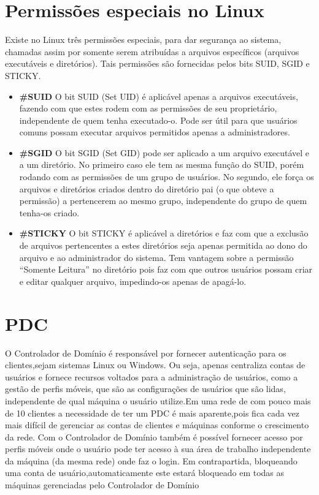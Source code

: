 
\section{Permissões especiais no Linux}

Existe no Linux três permissões especiais, para dar segurança ao sistema, chamadas assim por somente serem atribuídas a arquivos específicos (arquivos executáveis e diretórios). Tais permissões são fornecidas pelos bits SUID, SGID e STICKY.

  \begin{itemize}
    \item \textbf{\#SUID} O bit SUID (Set UID) é aplicável apenas a arquivos executáveis, fazendo com que estes rodem com as permissões de seu proprietário, independente de quem tenha executado-o. Pode ser útil para que usuários comuns possam executar arquivos permitidos apenas a administradores.

    \item \textbf{\#SGID} O bit SGID (Set GID) pode ser aplicado a um arquivo executável e a um diretório. No primeiro caso ele tem as mesma função do SUID, porém rodando com as permissões de um grupo de usuários. No segundo, ele força os arquivos e diretórios criados dentro do diretório pai (o que obteve a permissão) a pertencerem ao mesmo grupo, independente do grupo de quem tenha-os criado.

    \item \textbf{\#STICKY} O bit STICKY é aplicável a diretórios e faz com que a exclusão de arquivos pertencentes a estes diretórios seja apenas permitida ao dono do arquivo e ao administrador do sistema. Tem vantagem sobre a permissão “Somente Leitura” no diretório pois faz com que outros usuários possam criar e editar qualquer arquivo, impedindo-os apenas de apagá-lo.
  \end{itemize}

\section{PDC}

O Controlador de Domínio é responsável por fornecer autenticação para os clientes,sejam sistemas Linux ou Windows. Ou seja, apenas centraliza contas de usuários e fornece recursos voltados para a administração de usuários, como a gestão de perfis móveis, que são as configurações de usuários que são lidas, independente de qual máquina o usuário utilize.Em uma rede de com pouco mais de 10 clientes a necessidade de ter um PDC é mais aparente,pois fica cada vez mais difícil de gerenciar as contas de clientes e máquinas conforme o crescimento da rede. Com o Controlador de Domínio também é possível fornecer acesso por perfis móveis onde o usuário pode ter acesso à sua área de trabalho independente da máquina (da mesma rede) onde faz o login. Em contrapartida, bloqueando uma conta de usuário,automaticamente este estará bloqueado em todas as máquinas gerenciadas pelo Controlador de Domínio \cite{MORIMOTO}

